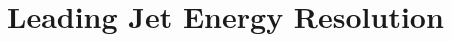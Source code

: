 \section{Leading Jet Energy Resolution}
\label{app:jetpuresolution}

\begin{figure}[htp]

    \centering
    \,
\end{figure}

